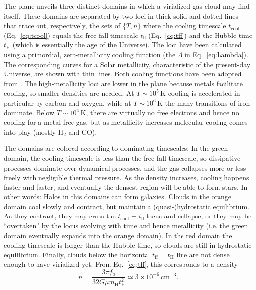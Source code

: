 \documentclass[useAMS]{aa}
\begin{document}
The plane unveils three distinct domains in which a virialized gas cloud may find itself.
These domains are separated by two loci in thick solid and dotted lines that trace out, respectively, the sets of $\{T,n\}$ where the cooling timescale $t_\mathrm{cool}$ (Eq.~\ref{eq:tcool}) equals the free-fall timescale $t_\mathrm{ff}$ (Eq.~\ref{eq:tff}) and the Hubble time $t_\mathrm{H}$ (which is essentially the age of the Universe).
The loci have been calculated using a primordial, zero-metallicity cooling function (the $\Lambda$ in Eq.~\ref{eq:Lambda}).
The corresponding curves for a Solar metallicity, characteristic of the present-day Universe, are shown with thin lines.
Both cooling functions have been adopted from \citet{Smith2008}.
The high-metallicity loci are lower in the plane because metals facilitate cooling, so smaller densities are needed.
At $T\sim10^5\,\mathrm{K}$ cooling is accelerated in particular by carbon and oxygen, while at $T\sim10^6\,\mathrm{K}$ the many transitions of iron dominate.
Below $T\sim10^4\,\mathrm{K}$, there are virtually no free electrons and hence no cooling for a metal-free gas, but as metallicity increases molecular cooling comes into play (mostly H$_2$ and CO).

The domains are colored according to dominating timescales:
In the green domain, the cooling timescale is less than the free-fall timescale, so dissipative processes dominate over dynamical processes, and the gas collapses more or less freely with negligible thermal pressure.
As the density increases, cooling happens faster and faster, and eventually the densest region will be able to form stars.
In other words: Halos in this domains can form galaxies.
Clouds in the orange domain cool slowly and contract, but maintain a (quasi-)hydrostatic equilibrium. 
As they contract, they may cross the $t_\mathrm{cool}=t_\mathrm{ff}$ locus and collapse, or they may be ``overtaken'' by the locus evolving with time and hence metallicity (i.e. the green domain eventually expands into the orange domain).
In the red domain the cooling timescale is longer than the Hubble time, so clouds are still in hydrostatic equilibrium.
Finally, clouds below the horizontal $t_\mathrm{ff}=t_\mathrm{H}$ line are not dense enough to have virialized yet. From Eq.~\ref{eq:tff}, this corresponds to a density
\begin{equation}
    \label{eq:n_ffH}
    n = \frac{3\pi f_\mathrm{b}}{32 G \mu m_\mathrm{H} t_\mathrm{H}^2}
      \simeq 3\times10^{-6}\,\mathrm{cm}^{-3}.
\end{equation}
\end{document}
